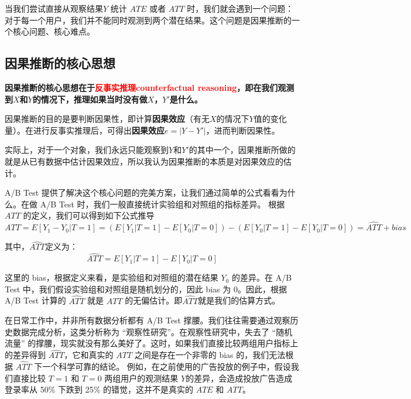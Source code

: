\documentclass[12pt]{article}
\begin{document}
当我们尝试直接从观察结果$Y$  统计 $ATE$ 或者 $ATT$ 时，我们就会遇到一个问题：对于每一个用户，我们并不能同时观测到两个潜在结果。这个问题是因果推断的一个核心问题、核心难点。

\subsection{因果推断的核心思想}
\begin{mdframed}[
linecolor=black!40,outerlinewidth=1pt,roundcorner=.5em,innertopmargin=1ex,innerbottommargin=.5\baselineskip,innerrightmargin=1em,innerleftmargin=1em,backgroundcolor=gray!5,
]
\textbf{因果推断的核心思想在于\textcolor{red}{反事实推理counterfactual reasoning}，即在我们观测到$X$和$Y$的情况下，推理如果当时没有做$X$，$Y'$是什么。}
\end{mdframed}

因果推断的目的是要判断因果性，即计算\textbf{因果效应}（有无$X$的情况下$Y$值的变化量）。在进行反事实推理后，可得出\textbf{因果效应}$e = |Y - Y'|$，进而判断因果性。

实际上，对于一个对象，我们永远只能观察到$Y$和$Y'$的其中一个，因果推断所做的就是从已有数据中估计因果效应，所以我认为因果推断的本质是对因果效应的估计。

A/B Test 提供了解决这个核心问题的完美方案，让我们通过简单的公式看看为什么。在做 A/B Test 时，我们一般直接统计实验组和对照组的指标差异。
根据 $ATT$ 的定义，我们可以得到如下公式推导
$$
ATT = E[Y_1 - Y_0 | T=1] = (E[Y_1|T=1] - E[Y_0|T=0]) - (E[Y_0|T=1] - E[Y_0|T=0]) = \hat{ATT} + bias
$$

其中，$\hat{ATT}$定义为：
$$
\hat{ATT} = E[Y_1 | T = 1] - E[Y_0|T=0]
$$

这里的 bias，根据定义来看，是实验组和对照组的潜在结果 $Y_0$ 的差异。在 A/B Test 中，我们假设实验组和对照组是随机划分的，因此 bias 为 0。因此，根据 A/B Test 计算的 $\hat{ATT}$ 就是 $ATT$ 的无偏估计。即$\hat{ATT}$就是我们的估算方式。

在日常工作中，并非所有数据分析都有 A/B Test 撑腰。我们往往需要通过观察历史数据完成分析，这类分析称为 “观察性研究”。在观察性研究中，失去了 “随机流量” 的撑腰，现实就没有那么美好了。这时，如果我们直接比较两组用户指标上的差异得到 $\hat{ATT}$，它和真实的 $ATT$ 之间是存在一个非零的 bias 的，我们无法根据  $\hat{ATT}$ 下一个科学可靠的结论。 例如，在之前使用的广告投放的例子中，假设我们直接比较 $T=1$ 和 $T=0$ 两组用户的观测结果 $Y$的差异，会造成投放广告造成登录率从 50\% 下跌到 25\% 的错觉，这并不是真实的 $ATE$ 和 $ATT$。
\end{document}
